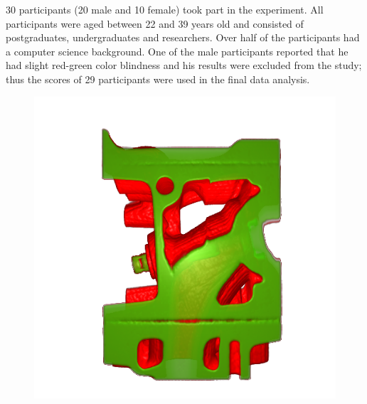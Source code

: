 30 participants (20 male and 10 female) took part in the experiment.
All participants were aged between 22 and 39 years old and consisted of postgraduates, undergraduates and researchers. Over half of the participants had a computer science background. One of the male participants reported that he had slight red-green color blindness and his results were excluded from the study; thus the scores of 29 participants were used in the final data analysis.

\begin{figure}
\centering
\begin{minipage}{.15\textwidth}
\includegraphics[width=1\linewidth]{images/engine_naive}
\end{minipage}~
\begin{minipage}{.15\textwidth}

\end{minipage}
\end{figure}
